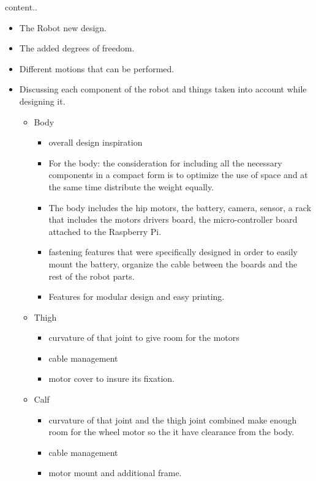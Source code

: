 \begin{todobox}
	content..
\end{todobox}
\begin{itemize}
	\item The Robot new design.
	\item The added degrees of freedom.
	\item Different motions that can be performed.
	\item Discussing each component of the robot and things taken into account while designing it.
	\begin{itemize}
		\item Body
		\begin{itemize}
		\item overall design inspiration
		\item For the body: the consideration for including all the necessary components in a compact form is to optimize the use of space and at the same time distribute the weight equally.
		\item The body includes the hip motors, the battery, camera, sensor, a rack that includes the motors drivers board, the micro-controller board attached to the Raspberry Pi.
		\item fastening features that were specifically designed in order to easily mount the battery, organize the cable between the boards and the rest of the robot parts.
		\item Features for modular design and easy printing.
		\end{itemize}
			\item Thigh
		\begin{itemize}
			\item curvature of that joint to give room for the motors 
			\item cable management 
			\item motor cover to insure its fixation. 
		\end{itemize}
			\item Calf
		\begin{itemize}
			\item curvature of that joint and the thigh joint combined make enough room for the wheel motor so the it have clearance from the body. 
			\item cable management 
			\item motor mount and additional frame.
		\end{itemize}
	\end{itemize}
\end{itemize}


